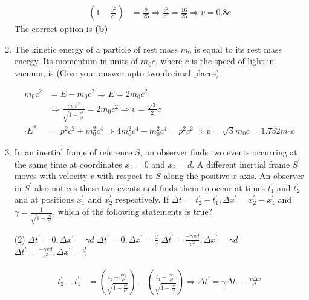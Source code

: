 \begin{enumerate}
\begin{answer}
\begin{align*}
	\left(1-\frac{v^{2}}{c^{2}}\right)&=\frac{9}{25} \Rightarrow \frac{v^{2}}{c^{2}}=\frac{16}{25} \Rightarrow v=0.8 c
	\end{align*}
	The correct option is \textbf{(b)}
\end{answer}
	\item The kinetic energy of a particle of rest mass $m_{0}$ is equal to its rest mass energy. Its momentum in units of $m_{0} c$, where $c$ is the speed of light in vacuum, is
	(Give your answer upto two decimal places)
	{}
\begin{answer}
\begin{align*}
m_{0} c^{2}&=E-m_{0} c^{2} \Rightarrow E=2 m_{0} c^{2}\\
&\Rightarrow \frac{m_{0} c^{2}}{\sqrt{1-\frac{v^{2}}{c^{2}}}}=2 m_{0} c^{2} \Rightarrow v=\frac{\sqrt{3}}{2} c\\
\cdot E^{2}&=p^{2} c^{2}+m_{0}^{2} c^{4} \Rightarrow 4 m_{0}^{2} c^{4}-m_{0}^{2} c^{4}=p^{2} c^{2} \Rightarrow p=\sqrt{3} m_{0} c=1.732 m_{0} c
\end{align*}	
\end{answer}
	\item In an inertial frame of reference $S$, an observer finds two events occurring at the same time at coordinates $x_{1}=0$ and $x_{2}=d$. A different inertial frame $S^{\prime}$ moves with velocity $v$ with respect to $S$ along the positive $x$-axis. An observer in $S^{\prime}$ also notices these two events and finds them to occur at times $t_{1}^{\prime}$ and $t_{2}^{\prime}$ and at positions $x_{1}^{\prime}$ and $x_{2}^{\prime}$ respectively.
	If $\Delta t^{\prime}=t_{2}^{\prime}-t_{1}^{\prime}, \Delta x^{\prime}=x_{2}^{\prime}-x_{1}^{\prime}$ and $\gamma=\frac{1}{\sqrt{1-\frac{v^{2}}{c^{2}}}}$, which of the following statements is true?
	{}
\begin{tasks}(2)
	\task[\textbf{A.}] $\Delta t^{\prime}=0, \Delta x^{\prime}=\gamma d$
	\task[\textbf{B.}] $\Delta t^{\prime}=0, \Delta x^{\prime}=\frac{d}{\gamma}$
	\task[\textbf{C.}]$\Delta t^{\prime}=\frac{-\gamma v d}{c^{2}}, \Delta x^{\prime}=\gamma d$
	\task[\textbf{D.}] $\Delta t^{\prime}=\frac{-\gamma v d}{c^{2}}, \Delta x^{\prime}=\frac{d}{\gamma}$
\end{tasks}
\begin{answer}
	\begin{align*}
	t_{2}^{\prime}-t_{1}^{\prime}&=\left(\frac{t_{2}-\frac{v x_{2}}{c^{2}}}{\sqrt{1-\frac{v^{2}}{c^{2}}}}\right)-\left(\frac{t_{1}-\frac{v x_{1}}{c^{2}}}{\sqrt{1-\frac{v^{2}}{c^{2}}}}\right) \Rightarrow \Delta t^{\prime}=\gamma \Delta t-\frac{\gamma v \Delta x}{c^{2}}\\

\end{align*}
\end{answer}
\end{enumerate}

